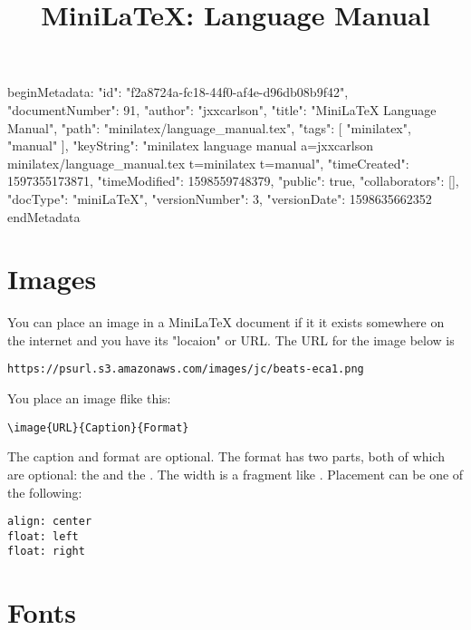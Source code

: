 beginMetadata:
{
    "id": "f2a8724a-fc18-44f0-af4e-d96db08b9f42",
    "documentNumber": 91,
    "author": "jxxcarlson",
    "title": "MiniLaTeX Language Manual",
    "path": "minilatex/language_manual.tex",
    "tags": [
        "minilatex",
        "manual"
    ],
    "keyString": "minilatex language manual a=jxxcarlson minilatex/language_manual.tex t=minilatex t=manual",
    "timeCreated": 1597355173871,
    "timeModified": 1598559748379,
    "public": true,
    "collaborators": [],
    "docType": "miniLaTeX",
    "versionNumber": 3,
    "versionDate": 1598635662352
}
endMetadata
\title{MiniLaTeX: Language Manual}

\maketitle

\tableofcontents


\section{Images}

You can place an image in a MiniLaTeX document if it it exists somewhere on the internet and you have its "locaion" or URL.  The URL for the image below is

\begin{verbatim}
https://psurl.s3.amazonaws.com/images/jc/beats-eca1.png
\end{verbatim}

You place an image flike this:

\begin{verbatim}
\image{URL}{Caption}{Format}
\end{verbatim}

The caption and format are optional.  The format has two parts, both of which are optional: the  and the . The width is a fragment like .  Placement can be one of the following:

\begin{verbatim}
align: center
float: left
float: right
\end{verbatim}


\section{Fonts}

